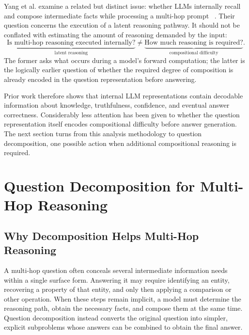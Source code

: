 Yang et al. examine a related but distinct issue: whether LLMs internally recall
and compose intermediate facts while processing a multi-hop prompt
~\cite{yang2024latent}. Their question concerns the execution of a latent
reasoning pathway. It should not be conflated with estimating the amount of
reasoning demanded by the input:
\begin{equation}
  \underbrace{\text{Is multi-hop reasoning executed internally?}}
    _{\text{latent reasoning}}
  \neq
  \underbrace{\text{How much reasoning is required?}}
    _{\text{compositional difficulty}}.
  \label{eq:latent-versus-required-reasoning}
\end{equation}
The former asks what occurs during a model's forward computation; the latter is
the logically earlier question of whether the required degree of composition is
already encoded in the question representation before answering.

Prior work therefore shows that internal LLM representations contain decodable
information about knowledge, truthfulness, confidence, and eventual answer
correctness. Considerably less attention has been given to whether the question
representation itself encodes compositional difficulty before answer
generation. The
next section turns from this analysis methodology to question decomposition,
one possible action when additional compositional reasoning is required.

\section{Question Decomposition for Multi-Hop Reasoning}
\label{sec:decomposition}

\subsection{Why Decomposition Helps Multi-Hop Reasoning}
\label{subsec:why-decomposition-helps}

A multi-hop question often conceals several intermediate information needs
within a single surface form. Answering it may require identifying an entity,
recovering a property of that entity, and only then applying a comparison or
other operation. When these steps remain implicit, a model must determine the
reasoning path, obtain the necessary facts, and compose them at the same time.
Question decomposition instead converts the original question into simpler,
explicit subproblems whose answers can be combined to obtain the final answer.

